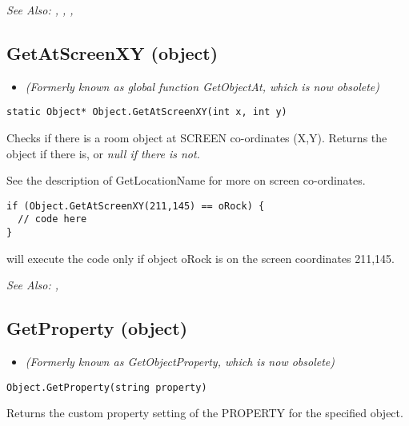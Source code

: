 \it{See Also:} ,
, ,


\subsection{GetAtScreenXY (object)}\label{Object.GetAtScreenXY}%

\begin{itemize}
\item \it{(Formerly known as global function GetObjectAt, which is now obsolete)}
\end{itemize}

\begin{verbatim}
static Object* Object.GetAtScreenXY(int x, int y)
\end{verbatim}
Checks if there is a room object at SCREEN co-ordinates (X,Y).
Returns the object if there is, or \it{null} if there is not.

See the description of GetLocationName for more on screen co-ordinates.

\begin{verbatim}
if (Object.GetAtScreenXY(211,145) == oRock) {
  // code here
}
\end{verbatim}
will execute the code only if object oRock is on the screen coordinates 211,145.

\it{See Also:} ,


\subsection{GetProperty (object)}\label{Object.GetProperty}%

\begin{itemize}
\item \it{(Formerly known as GetObjectProperty, which is now obsolete)}
\end{itemize}

\begin{verbatim}
Object.GetProperty(string property)
\end{verbatim}
Returns the custom property setting of the PROPERTY for the specified object.

